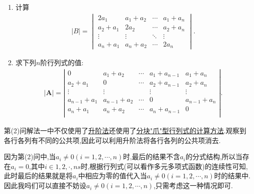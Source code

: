 \documentclass[../../main.tex]{subfiles}%
\begin{document}
\begin{example}
\begin{enumerate}[(1)]
\item 计算
\begin{align*}
|B| = 
\begin{vmatrix}
2a_1 & a_1 + a_2 & \cdots & a_1 + a_n \\
a_2 + a_1 & 2a_2 & \cdots & a_2 + a_n \\
\vdots & \vdots & \ddots & \vdots \\
a_n + a_1 & a_n + a_2 & \cdots & 2a_n
\end{vmatrix}.
\end{align*}

\item 求下列$n$阶行列式的值:
\begin{align*}
|\boldsymbol{A}|=\left| \begin{matrix}
0&		a_1+a_2&		\cdots&		a_1+a_{n-1}&		a_1+a_n\\
a_2+a_1&		0&		\cdots&		a_2+a_{n-1}&		a_2+a_n\\
\vdots&		\vdots&		&		\vdots&		\vdots\\
a_{n-1}+a_1&		a_{n-1}+a_2&		\cdots&		0&		a_{n-1}+a_n\\
a_n+a_1&		a_n+a_2&		\cdots&		a_n+a_{n-1}&		0\\
\end{matrix} \right|.
\end{align*}
\end{enumerate}
\end{example}
\begin{note}
第(2)问{\color{blue}解法一}中不仅使用了\hyperlink{行列式计算:升阶法}{升阶法}还使用了\hyperref[proposition:分块"爪"型行列式]{分块"爪"型行列式的计算方法}.观察到各行各列有不同的公共项,因此可以利用升阶法将各行各列的公共项消去.
\end{note}
\begin{remark}
因为第(2)问中,当$a_i\ne 0(i=1,2,\cdots,n)$时,最后的结果不含$a_i$的分式结构,所以当存在$a_i=0$,其中$i\in{1,2,\cdot,ns}$时,根据行列式(可以看作多元多项式函数)的连续性可知,此时最后的结果就是将$a_i$中相应为零的值代入当$a_i\ne 0(i=1,2,\cdots,n)$时的结果中.因此我吗们可以直接不妨设$a_i\ne 0(i=1,2,\cdots,n)$,只需考虑这一种情况即可.
\end{remark}
\end{document}
